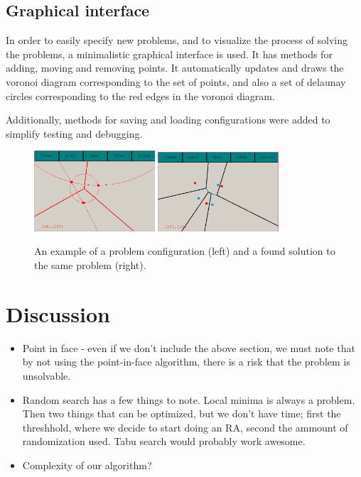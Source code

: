\documentclass[a4paper,12pt]{article}
\begin{document}
\subsection{Graphical interface}
In order to easily specify new problems, and to visualize the process of solving the problems, a minimalistic graphical interface is used. It has methods for adding, moving and removing points. It automatically updates and draws the voronoi diagram corresponding to the set of points, and also a set of delaunay circles corresponding to the red edges in the voronoi diagram.

Additionally, methods for saving and loading configurations were added to simplify testing and debugging.

\begin{figure}[h]
\includegraphics[width=0.4\textwidth]{pictures/gui.png}
\includegraphics[width=0.4\textwidth]{pictures/guisolved.png}
 \caption[Close up of \textit{Hemidactylus} sp.]
   {An example of a problem configuration (left) and a found solution to the same problem (right).}
\end{figure}


\section{Discussion}
\begin{itemize}
\item
Point in face - even if we don't include the above section, we must note that by not using the point-in-face algorithm, there is a risk that the problem is unsolvable.
\item
Random search has a few things to note. Local minima is always a problem. Then two things that can be optimized, but we don't have time; first the threshhold, where we decide to start doing an RA, second the ammount of randomization used. Tabu search would probably work awesome.
\item
Complexity of our algorithm? 
\end{itemize}
\end{document}
